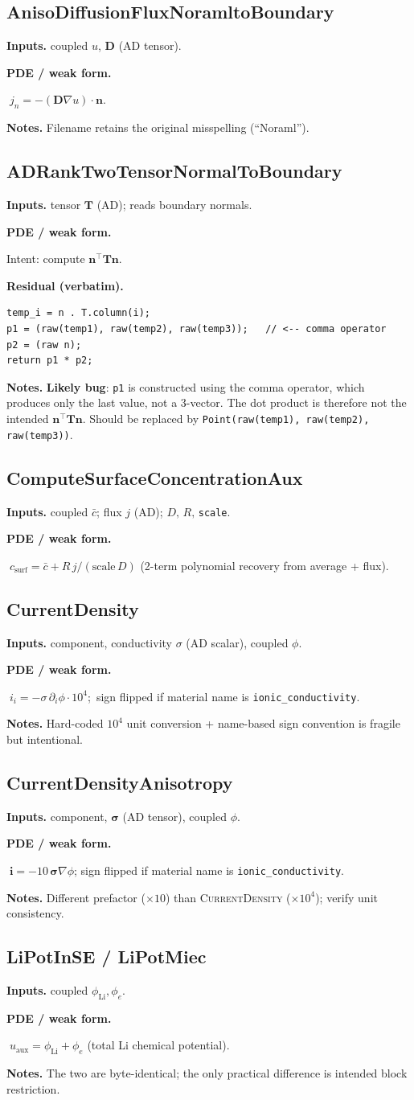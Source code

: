 \documentclass[11pt]{article}
\newcommand{\nvec}{\mathbf{n}}
\newenvironment{ecmEntry}[1]{%
  \subsection{#1}%
}{}
\newcommand{\inputsRow}[1]{\par\noindent\textbf{Inputs.} #1\par}
\newcommand{\pdeRow}[1]{\par\noindent\textbf{PDE / weak form.}\par #1\par}
\newcommand{\codeRow}{\par\noindent\textbf{Residual (verbatim).}\par}
\newcommand{\notesRow}[1]{\par\noindent\textbf{Notes.} #1\par}
\begin{document}
\begin{ecmEntry}{AnisoDiffusionFluxNoramltoBoundary}
\inputsRow{coupled $u$, $\bm{D}$ (AD tensor).}
\pdeRow{$\;j_n = -(\bm{D}\nabla u)\!\cdot\!\nvec$.}
\notesRow{Filename retains the original misspelling (``Noraml'').}
\end{ecmEntry}

\begin{ecmEntry}{ADRankTwoTensorNormalToBoundary}
\inputsRow{tensor $\bm{T}$ (AD); reads boundary normals.}
\pdeRow{Intent: compute $\nvec^{\!\top}\bm{T}\nvec$.}
\codeRow\begin{lstlisting}
temp_i = n . T.column(i);
p1 = (raw(temp1), raw(temp2), raw(temp3));   // <-- comma operator
p2 = (raw n);
return p1 * p2;
\end{lstlisting}
\notesRow{\textbf{Likely bug}: \texttt{p1} is constructed using the comma operator, which
produces only the last value, not a 3-vector. The dot product is therefore not the intended
$\nvec^{\!\top}\bm{T}\nvec$. Should be replaced by \texttt{Point(raw(temp1), raw(temp2), raw(temp3))}.}
\end{ecmEntry}

\begin{ecmEntry}{ComputeSurfaceConcentrationAux}
\inputsRow{coupled $\bar c$; flux $j$ (AD); $D,\,R,\,$\texttt{scale}.}
\pdeRow{$\;c_{\text{surf}} = \bar c + R\,j/(\text{scale}\,D)$
(2-term polynomial recovery from average + flux).}
\end{ecmEntry}

\begin{ecmEntry}{CurrentDensity}
\inputsRow{component, conductivity $\sigma$ (AD scalar), coupled $\phi$.}
\pdeRow{$\;i_i = -\sigma\,\partial_i\phi\cdot 10^4$;\, sign flipped if material name is
\texttt{ionic\_conductivity}.}
\notesRow{Hard-coded $10^4$ unit conversion + name-based sign convention is fragile but
intentional.}
\end{ecmEntry}

\begin{ecmEntry}{CurrentDensityAnisotropy}
\inputsRow{component, $\bm{\sigma}$ (AD tensor), coupled $\phi$.}
\pdeRow{$\;\bm{i} = -10\,\bm{\sigma}\nabla\phi$; sign flipped if material name is
\texttt{ionic\_conductivity}.}
\notesRow{Different prefactor ($\times 10$) than \textsc{CurrentDensity} ($\times 10^4$);
verify unit consistency.}
\end{ecmEntry}

\begin{ecmEntry}{LiPotInSE / LiPotMiec}
\inputsRow{coupled $\phi_{\text{Li}},\phi_e$.}
\pdeRow{$\;u_{\text{aux}} = \phi_{\text{Li}} + \phi_e$ (total Li chemical potential).}
\notesRow{The two are byte-identical; the only practical difference is intended block
restriction.}
\end{ecmEntry}
\end{document}
